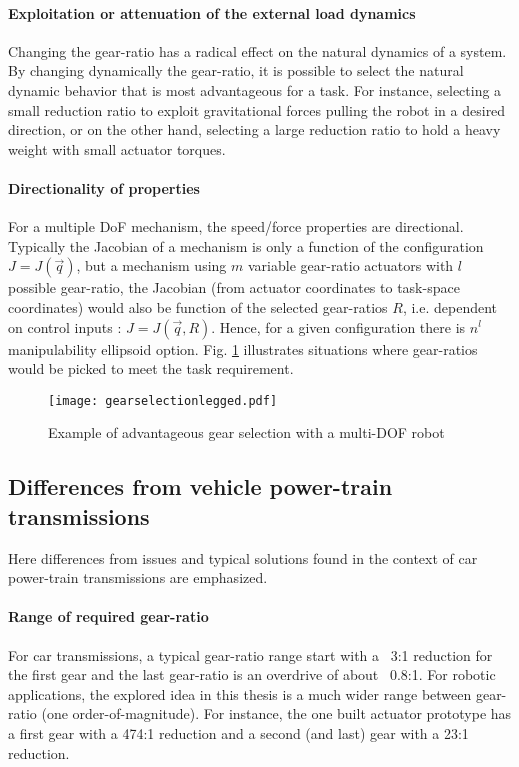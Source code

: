 \paragraph{Exploitation or attenuation of the external load dynamics}
Changing the gear-ratio has a radical effect on the natural dynamics of a system. By changing dynamically the gear-ratio, it is possible to select the natural dynamic behavior that is most advantageous for a task. For instance, selecting a small reduction ratio to exploit gravitational forces pulling the robot in a desired direction, or on the other hand, selecting a large reduction ratio to hold a heavy weight with small actuator torques.

\paragraph{Directionality of properties}
For a multiple DoF mechanism, the speed/force properties are directional. Typically the Jacobian of a mechanism is only a function of the configuration $J=J(\vec{q})$, but a mechanism using $m$ variable gear-ratio actuators with $l$ possible gear-ratio, the Jacobian (from actuator coordinates to task-space coordinates) would also be function of the selected gear-ratios $R$, i.e. dependent on control inputs : $J=J(\vec{q},R)$. Hence, for a given configuration there is $n^l$ manipulability ellipsoid option. Fig. \ref{fig:gearselectionlegged} illustrates situations where gear-ratios would be picked to meet the task requirement.


\begin{figure}[H]
	\centering
		\texttt{[image: gearselectionlegged.pdf]}
	\caption{Example of advantageous gear selection with a multi-DOF robot}
	\label{fig:gearselectionlegged}
\end{figure}


\subsection{Differences from vehicle power-train transmissions}

Here differences from issues and typical solutions found in the context of car power-train transmissions are emphasized.

\paragraph{Range of required gear-ratio}
%
For car transmissions, a typical gear-ratio range start with a ~3:1 reduction for the first gear and the last gear-ratio is an overdrive of about ~0.8:1. For robotic applications, the explored idea in this thesis is a much wider range between gear-ratio (one order-of-magnitude). For instance, the one built actuator prototype has a first gear with a 474:1 reduction and a second (and last) gear with a 23:1 reduction. 


